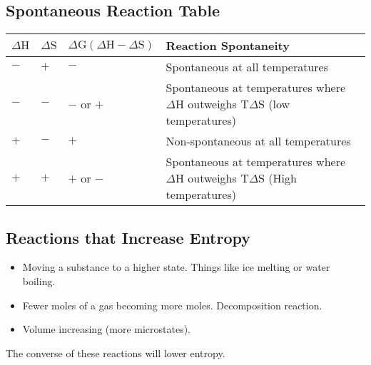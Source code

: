 \documentclass[]{article}
\begin{document}
\subsection{Spontaneous Reaction Table}
\begin{tabular}{p{.1\linewidth} p{.1\linewidth} p{.2\linewidth} p{.6\linewidth}}
$ \Delta \text{H} $ & $ \Delta \text{S} $ & $ \Delta \text{G}  (\Delta \text{H} - \Delta \text{S})$ & Reaction Spontaneity \\
\hline
$ - $ & $ + $ & $ - $ & Spontaneous at all temperatures \\
$ - $ & $ - $ & $ - $ or $ + $ & Spontaneous at temperatures where $ \Delta \text{H} $ outweighs $ \text{T} \Delta \text{S} $ (low temperatures) \\
$ + $ & $ - $ & $ + $ & Non-spontaneous at all temperatures \\

$ + $ & $ + $ & $ + $ or $ - $ & Spontaneous at temperatures where $ \Delta \text{H} $ outweighs $ \text{T} \Delta \text{S} $ (High temperatures) \\
\end{tabular}
\subsection{Reactions that Increase Entropy}
\begin{itemize}
\item Moving a substance to a higher state. Things like ice melting or water boiling.
\item Fewer moles of a gas becoming more moles. Decomposition reaction.
\item Volume increasing (more microstates).
\end{itemize}
The converse of these reactions will lower entropy.
\end{document}
